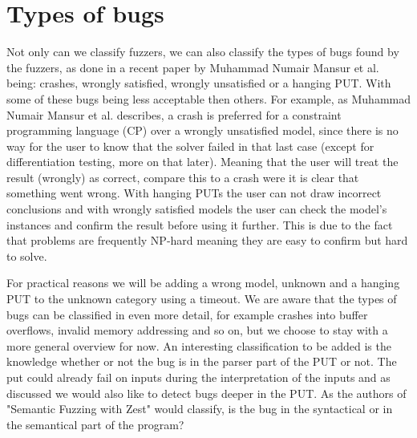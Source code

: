\section{Types of bugs}
\label{cha:2:TypesOfBugs}
Not only can we classify fuzzers, we can also classify the types of bugs found by the fuzzers, as done in a recent paper \cite{1mansur2020detecting} by Muhammad Numair Mansur et al. being: crashes, wrongly satisfied, wrongly unsatisfied or a hanging PUT. With some of these bugs being less acceptable then others. For example, as Muhammad Numair Mansur et al. describes, a crash is preferred for a constraint programming language (CP) over a wrongly unsatisfied model, since there is no way for the user to know that the solver failed in that last case (except for differentiation testing, more on that later). Meaning that the user will treat the result (wrongly) as correct, compare this to a crash were it is clear that something went wrong. With hanging PUTs the user can not draw incorrect conclusions and with wrongly satisfied models the user can check the model's instances and confirm the result before using it further. This is due to the fact that problems are frequently NP-hard meaning they are easy to confirm but hard to solve. 

For practical reasons we will be adding a wrong model, unknown and a hanging PUT to the unknown category using a timeout. We are aware that the types of bugs can be classified in even more detail, for example crashes into buffer overflows, invalid memory addressing and so on, but we choose to stay with a more general overview for now. An interesting classification to be added is the knowledge whether or not the bug is in the parser part of the PUT or not. The put could already fail on inputs during the interpretation of the inputs and as discussed we would also like to detect bugs deeper in the PUT. As the authors of "Semantic Fuzzing with Zest" \cite{22SemanticFuzzing} would classify, is the bug in the syntactical or in the semantical part of the program?

